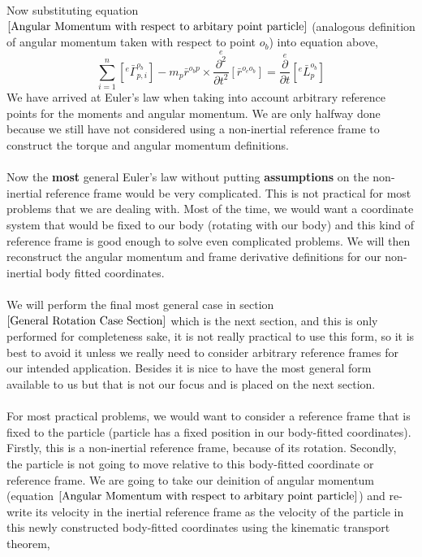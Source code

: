 Now substituting equation $\ref{Angular Momentum with respect to arbitary point particle}$ (analogous definition of angular momentum taken with respect to point $o_{b}$) into equation above,
\begin{equation}
\sum^{n}_{i = 1}\left[{}^{e}\bar{\Gamma}^{o_{b}}_{p,i}\right] - m_{p}\bar{r}^{o_{b}p}\times\overset{e}{\frac{\partial^{2}}{\partial t^{2}}}[\bar{r}^{o_{e}o_{b}}] = \overset{e}{\frac{\partial}{\partial t}}\left[{}^{e}\bar{L}^{o_{b}}_{p}\right]
\label{Euler's Law Point Particle Non-Inertial Moving Reference Point}
\end{equation}
We have arrived at Euler's law when taking into account arbitrary reference points for the moments and angular momentum.
We are only halfway done because we still have not considered using a non-inertial reference frame to construct the torque and angular momentum definitions.
\\~\\Now the \textbf{most} general Euler's law without putting \textbf{assumptions} on the non-inertial reference frame would be very complicated.
This is not practical for most problems that we are dealing with.
Most of the time, we would want a coordinate system that would be fixed to our body (rotating with our body) and this kind of reference frame is good enough to solve even complicated problems.
We will then reconstruct the angular momentum and frame derivative definitions for our non-inertial body fitted coordinates.
\\~\\We will perform the final most general case in section $\ref{General Rotation Case Section}$ which is the next section, and this is only performed for completeness sake, it is not really practical to use this form, so it is best to avoid it unless we really need to consider arbitrary reference frames for our intended application.
Besides it is nice to have the most general form available to us but that is not our focus and is placed on the next section.
\\~\\For most practical problems, we would want to consider a reference frame that is fixed to the particle (particle has a fixed position in our body-fitted coordinates).
Firstly, this is a non-inertial reference frame, because of its rotation.
Secondly, the particle is not going to move relative to this body-fitted coordinate or reference frame.
We are going to take our deinition of angular momentum (equation $\ref{Angular Momentum with respect to arbitary point particle}$) and re-write its velocity in the inertial reference frame as the velocity of the particle in this newly constructed body-fitted coordinates using the kinematic transport theorem,
